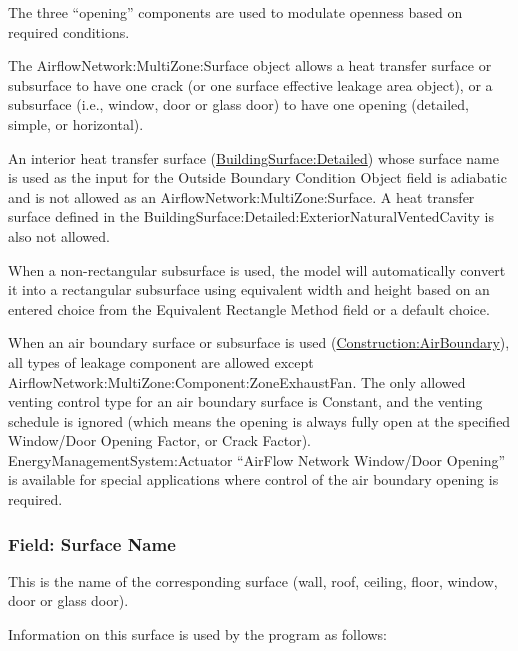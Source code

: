 The three ``opening'' components are used to modulate openness based on required conditions.

The AirflowNetwork:MultiZone:Surface object allows a heat transfer surface or subsurface to have one crack (or one surface effective leakage area object), or a subsurface (i.e., window, door or glass door) to have one opening (detailed, simple, or horizontal).


An interior heat transfer surface (\hyperref[buildingsurfacedetailed]{BuildingSurface:Detailed}) whose surface name is used as the input for the Outside Boundary Condition Object field is adiabatic and is not allowed as an AirflowNetwork:MultiZone:Surface. A heat transfer surface defined in the BuildingSurface:Detailed:ExteriorNaturalVentedCavity is also not allowed.

When a non-rectangular subsurface is used, the model will automatically convert it into a rectangular subsurface using equivalent width and height based on an entered choice from the Equivalent Rectangle Method field or a default choice.

When an air boundary surface or subsurface is used (\hyperref[constructionairboundary]{Construction:AirBoundary}), all types of leakage component are allowed except AirflowNetwork:MultiZone:Component:ZoneExhaustFan. The only allowed venting control type for an air boundary surface is Constant, and the venting schedule is ignored (which means the opening is always fully open at the specified Window/Door Opening Factor, or Crack Factor). EnergyManagementSystem:Actuator ``AirFlow Network Window/Door Opening'' is available for special applications where control of the air boundary opening is required.

\subsubsection{Field: Surface Name}\label{field-surface-name-000}

This is the name of the corresponding surface (wall, roof, ceiling, floor, window, door or glass door).

Information on this surface is used by the program as follows:

